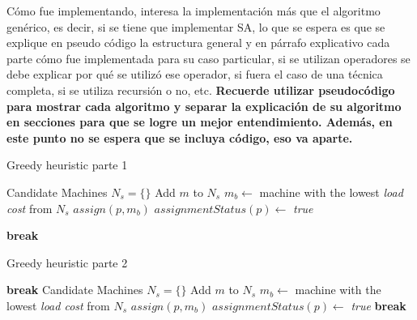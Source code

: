 \documentclass[../informe2.tex]{subfiles}
\begin{document}
Cómo fue implementando, interesa la implementación más que el algoritmo
genérico, es decir, si se tiene que implementar SA, lo que se espera
es que se explique en pseudo código la estructura general y en párrafo
explicativo cada parte cómo fue implementada para su caso particular,
si se utilizan operadores se debe explicar por qué se utilizó ese
operador, si fuera el caso de una técnica completa, si se utiliza
recursión o no, etc. \textbf{Recuerde utilizar pseudocódigo para mostrar
cada algoritmo y separar la explicación de su algoritmo en secciones
para que se logre un mejor entendimiento. Además, en este punto no
se espera que se incluya código, eso va aparte.}

\begin{algorithm}
	\caption{Greedy heuristic parte 1}
	\label{algorithm:greedy-1}
	\begin{algorithmic}[1]
			\State Candidate Machines $N_s = \{\}$
					\State Add $m$ to $N_s$
				\EndIf
			\EndFor
				\State $m_b \gets$ machine with the lowest \textit{load cost} from $N_s$
				\State $assign(p, m_b)$
				\State $assignmentStatus(p) \gets$ \textit{true}
			\EndIf
			
				\State \textbf{break}
			\EndIf
		\EndFor		
		\EndProcedure
	\end{algorithmic}
\end{algorithm}

\begin{algorithm}
	\caption{Greedy heuristic parte 2}
	\label{algorithm:greedy-2}
	\begin{algorithmic}[1]
				\State \textbf{break}
			\EndIf
				\State Candidate Machines $N_s = \{\}$
						\State Add $m$ to $N_s$
					\EndIf
				\EndFor			
					\State $m_b \gets$ machine with the lowest \textit{load cost} from $N_s$
					\State $assign(p, m_b)$
					\State $assignmentStatus(p) \gets$ \textit{true}
				\EndIf
					\State \textbf{break}
				\EndIf
			\EndFor		
		\EndFor		
		\EndProcedure
	\end{algorithmic}
\end{algorithm}
\end{document}
